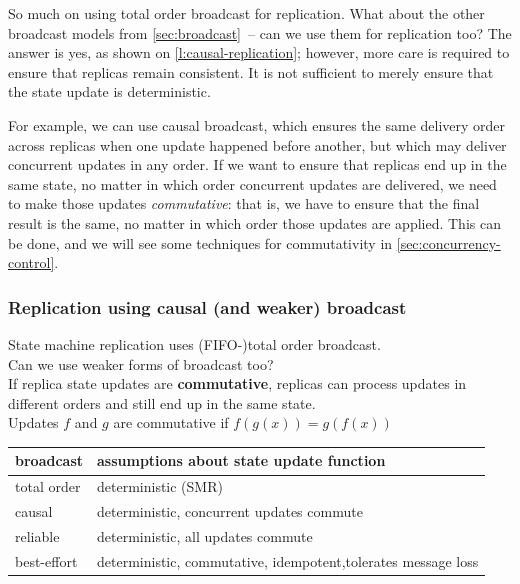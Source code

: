So much on using total order broadcast for replication.
What about the other broadcast models from \autoref{sec:broadcast}~-- can we use them for replication too?
The answer is yes, as shown on \autoref{l:causal-replication}; however, more care is required to ensure that replicas remain consistent.
It is not sufficient to merely ensure that the state update is deterministic.

For example, we can use causal broadcast, which ensures the same delivery order across replicas when one update happened before another, but which may deliver concurrent updates in any order.
If we want to ensure that replicas end up in the same state, no matter in which order concurrent updates are delivered, we need to make those updates \emph{commutative}: that is, we have to ensure that the final result is the same, no matter in which order those updates are applied.
This can be done, and we will see some techniques for commutativity in \autoref{sec:concurrency-control}.

\begin{frame}
    \label{s:causal-replication}
    \frametitle{Replication using causal (and weaker) broadcast}
    State machine replication uses (FIFO-)total order broadcast.\\
    Can we use weaker forms of broadcast too?\\[1em]\pause
    If replica state updates are \textbf{commutative}, replicas can process updates in different orders and still end up in the same state.\\[1em]
    Updates $f$ and $g$ are commutative if $f(g(x)) = g(f(x))$\\\pause
    \renewcommand{\arraystretch}{1.3}
    \begin{tabular}{l|p{8cm}}
        \hline
        \textbf{broadcast} & \textbf{assumptions about state update function} \\\hline
        total order & deterministic (SMR) \pause\\
        causal & deterministic, concurrent updates commute \pause\\
        reliable & deterministic, all updates commute \pause\\
        best-effort & deterministic, commutative, idempotent,\newline tolerates message loss \\\hline
    \end{tabular}
\end{frame}
\label{l:causal-replication}

